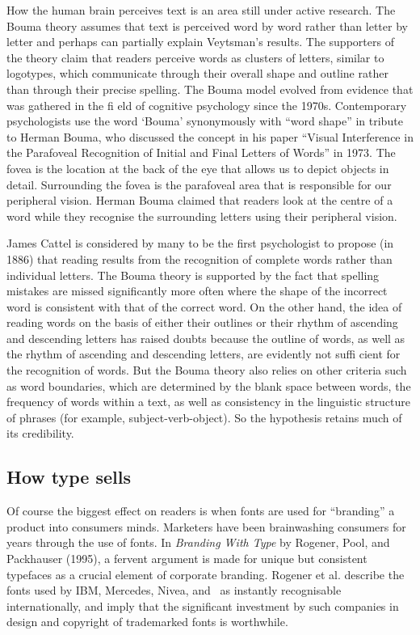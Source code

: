 How the human brain perceives text is an area still under active research. The Bouma theory assumes that
text is perceived word by word rather than letter by letter and perhaps can partially explain Veytsman's results.  The supporters of the theory claim that readers perceive words as clusters of letters, similar to
logotypes, which communicate through their overall shape and outline rather than through their precise spelling. The Bouma model evolved from evidence that
was gathered in the fi eld of cognitive psychology since
the 1970s. Contemporary psychologists use the word
‘Bouma’ synonymously with \enquote{word shape} in tribute to
Herman Bouma, who discussed the concept in his paper
\enquote{Visual Interference in the Parafoveal Recognition of Initial
and Final Letters of Words} in 1973. The fovea is the
location at the back of the eye that allows us to depict
objects in detail. Surrounding the fovea is the parafoveal
area that is responsible for our peripheral vision. Herman
Bouma claimed that readers look at the centre of a word
while they recognise the surrounding letters using their
peripheral vision.

James Cattel is considered by many to be the first
psychologist to propose (in 1886) that reading results
from the recognition of complete words rather than
individual letters. The Bouma theory is supported by the
fact that spelling mistakes are missed significantly more
often where the shape of the incorrect word is consistent
with that of the correct word. On the other hand, the idea
of reading words on the basis of either their outlines or
their rhythm of ascending and descending letters has
raised doubts because the outline of words, as well as
the rhythm of ascending and descending letters, are
evidently not suffi cient for the recognition of words. But
the Bouma theory also relies on other criteria such as
word boundaries, which are determined by the blank
space between words, the frequency of words within
a text, as well as consistency in the linguistic structure
of phrases (for example, subject-verb-object). So the
hypothesis retains much of its credibility.

\subsection*{How type sells}

Of course the biggest effect on readers is when fonts are used for ``branding'' a product into consumers minds. 
Marketers have been brainwashing
consumers for years through the use of fonts. In \textit{Branding
With Type}  by Rogener, Pool, and Packhauser
(1995), a fervent argument is made for unique
but consistent typefaces as a crucial element of
corporate branding. Rogener et al. describe the
fonts used by IBM, Mercedes, Nivea, and
\marlborologo\ as instantly recognisable
internationally, and imply that the significant
investment by such companies in design and
copyright of trademarked fonts is worthwhile. 

